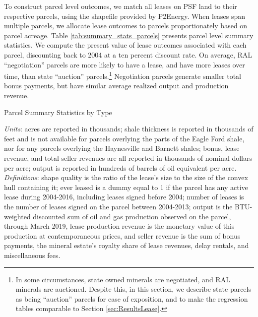 \documentclass[12pt]{article}
\begin{document}
To construct parcel level outcomes, we match all leases on PSF land to their respective parcels, using the shapefile provided by P2Energy. When leases span multiple parcels, we allocate lease outcomes to parcels proportionately based on parcel acreage.  Table \ref{tab:summary_stats_parcels} presents parcel level summary statistics. We compute the present value of lease outcomes associated with each parcel, discounting back to 2004 at a ten percent discount rate. On average, RAL ``negotiation'' parcels are more likely to have a lease, and have more leases over time, than state ``auction'' parcels.\footnote{In some circumstances, state owned minerals are negotiated, and RAL minerals are auctioned. Despite this, in this section, we describe state parcels as being ``auction'' parcels for ease of exposition, and to make the regression tables comparable to Section \ref{sec:ResultsLease}.} Negotiation parcels generate smaller total bonus payments, but have similar average realized output and production revenue. 

\addtolength{\tabcolsep}{-3pt}
\begin{table}[H]
\begin{center}
\begin{threeparttable}
	\caption{Parcel Summary Statistics by Type}
	\label{tab:summary_stats_parcels}
 	\small
	
	\footnotesize
    \begin{tablenotes}
    \item \textit{Units}: acres are reported in thousands; shale thickness is reported in thousands of feet and is not available for parcels overlying the parts of the Eagle Ford shale, nor for any parcels overlying the Haynesville and Barnett shales; bonus, lease revenue, and total seller revenues are all reported in thousands of nominal dollars per acre; output is reported in hundreds of barrels of oil equivalent per acre.  \textit{Definitions}: shape quality is the ratio of the lease's size to the size of the convex hull containing it; ever leased is a dummy equal to 1 if the parcel has any active lease during 2004-2016, including leases signed before 2004; number of leases is the number of leases signed on the parcel between 2004-2013; output is the BTU-weighted discounted sum of oil and gas production observed on the parcel, through March 2019, lease production revenue is the monetary value of this production at contemporaneous prices, and seller revenue is the sum of bonus payments, the mineral estate's royalty share of lease revenues, delay rentals, and miscellaneous fees. 
    \end{tablenotes}
\end{threeparttable}
\end{center}
\end{table}
\addtolength{\tabcolsep}{3pt}
\end{document}
